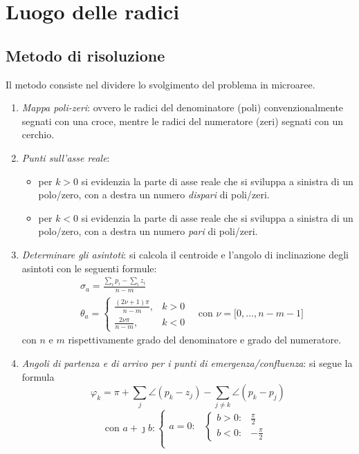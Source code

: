 \chapter{Luogo delle radici}
\section{Metodo di risoluzione}
Il metodo consiste nel dividere lo svolgimento del problema in microaree.
\begin{enumerate}
	\item \emph{Mappa poli-zeri}: ovvero le radici del denominatore (poli)
		convenzionalmente segnati con una croce, mentre le radici del
		numeratore (zeri) segnati con un cerchio.
	\item \emph{Punti sull'asse reale}:
		\begin{itemize}
			\item per \(k>0\) si evidenzia la parte di asse reale
			che si sviluppa a sinistra di un polo/zero, con a destra
			un numero \emph{dispari} di poli/zeri.
			\item per \(k<0\) si evidenzia la parte di asse reale
			che si sviluppa a sinistra di un polo/zero, con a destra
			un numero \emph{pari} di poli/zeri.
		\end{itemize}
	\item \emph{Determinare gli asintoti}: si calcola il centroide e l'angolo
		di inclinazione degli asintoti con le seguenti formule:
		\begin{align*}
			& \sigma_a = \frac{\sum_{i} p_i - \sum_{i} z_i}{n-m} \\
			& \theta_a = \begin{cases}
					\frac{(2\nu+1)\pi}{n-m}, & k>0 \\
					\frac{2\nu\pi}{n-m}, & k<0
				\end{cases}
				\quad \text{con } \nu = \bigl[0,\dots,n-m-1\bigr]
		\end{align*}
		con \(n\) e \(m\) rispettivamente grado del denominatore e grado del numeratore.
	\item \emph{Angoli di partenza e di arrivo per i punti di emergenza/confluenza}:
		si segue la formula
		\[
			\varphi_k = \pi +\sum_j \angle(p_k-z_j) -\sum_{j \neq k} \angle(p_k-p_j)
		\]
		\[
			\text{con } a+\jmath b \colon
			\begin{cases}
				a = 0 \colon &
					\begin{cases}
						b > 0\colon & \frac{\pi}{2} \\
						b < 0\colon & -\frac{\pi}{2}
					\end{cases} \\

\end{cases}\]
\end{enumerate}

